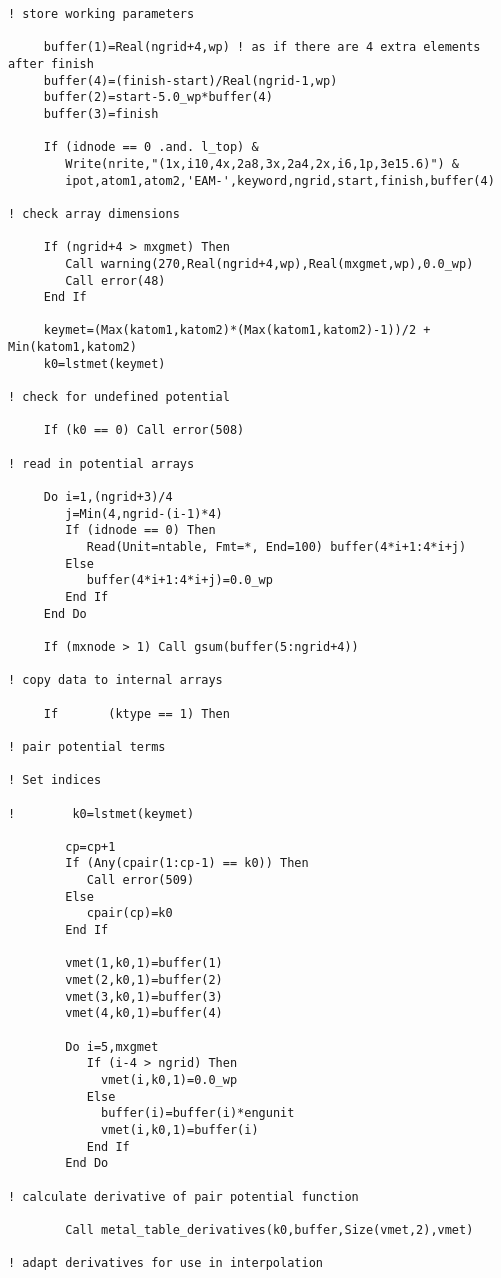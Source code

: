 \begin{lstlisting}[style=sFortran,caption={Add two numbers function}]
! store working parameters

     buffer(1)=Real(ngrid+4,wp) ! as if there are 4 extra elements after finish
     buffer(4)=(finish-start)/Real(ngrid-1,wp)
     buffer(2)=start-5.0_wp*buffer(4)
     buffer(3)=finish

     If (idnode == 0 .and. l_top) &
        Write(nrite,"(1x,i10,4x,2a8,3x,2a4,2x,i6,1p,3e15.6)") &
        ipot,atom1,atom2,'EAM-',keyword,ngrid,start,finish,buffer(4)

! check array dimensions

     If (ngrid+4 > mxgmet) Then
        Call warning(270,Real(ngrid+4,wp),Real(mxgmet,wp),0.0_wp)
        Call error(48)
     End If

     keymet=(Max(katom1,katom2)*(Max(katom1,katom2)-1))/2 + Min(katom1,katom2)
     k0=lstmet(keymet)

! check for undefined potential

     If (k0 == 0) Call error(508)

! read in potential arrays

     Do i=1,(ngrid+3)/4
        j=Min(4,ngrid-(i-1)*4)
        If (idnode == 0) Then
           Read(Unit=ntable, Fmt=*, End=100) buffer(4*i+1:4*i+j)
        Else
           buffer(4*i+1:4*i+j)=0.0_wp
        End If
     End Do

     If (mxnode > 1) Call gsum(buffer(5:ngrid+4))

! copy data to internal arrays

     If       (ktype == 1) Then

! pair potential terms

! Set indices

!        k0=lstmet(keymet)

        cp=cp+1
        If (Any(cpair(1:cp-1) == k0)) Then
           Call error(509)
        Else
           cpair(cp)=k0
        End If

        vmet(1,k0,1)=buffer(1)
        vmet(2,k0,1)=buffer(2)
        vmet(3,k0,1)=buffer(3)
        vmet(4,k0,1)=buffer(4)

        Do i=5,mxgmet
           If (i-4 > ngrid) Then
             vmet(i,k0,1)=0.0_wp
           Else
             buffer(i)=buffer(i)*engunit
             vmet(i,k0,1)=buffer(i)
           End If
        End Do

! calculate derivative of pair potential function

        Call metal_table_derivatives(k0,buffer,Size(vmet,2),vmet)

! adapt derivatives for use in interpolation


\end{lstlisting}

